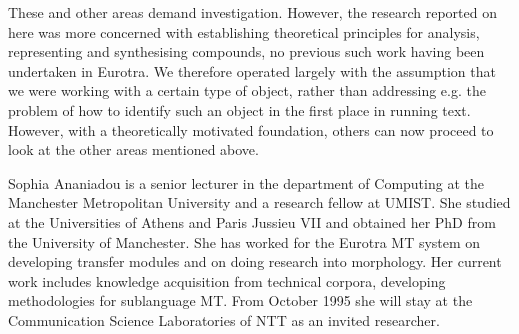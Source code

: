 These and other areas demand investigation. However, the research
reported on here was more concerned with establishing theoretical
principles for analysis, representing and synthesising compounds,
no previous such work having been undertaken in Eurotra. We 
therefore operated largely with the assumption that we were 
working with a certain type of object, rather than addressing
e.g. the problem of how to identify such an object in the first
place in running text. However, with a theoretically motivated
foundation, others can now proceed to look at the other areas
mentioned above.



\def\refname{}



\begin{biography}

\biotitle{}

{
Sophia Ananiadou is a senior lecturer in the department of
Computing at the Manchester Metropolitan University and a
research fellow at UMIST. She studied at the Universities of
Athens and Paris Jussieu VII and obtained her PhD from the
University of Manchester.
She has worked for the
Eurotra MT system on developing transfer modules
and on doing research into morphology. Her current work includes
knowledge acquisition from technical corpora, developing
methodologies for sublanguage MT. From October 1995 she will stay
at the Communication Science Laboratories of  NTT as an invited
researcher.
}


\end{biography}


